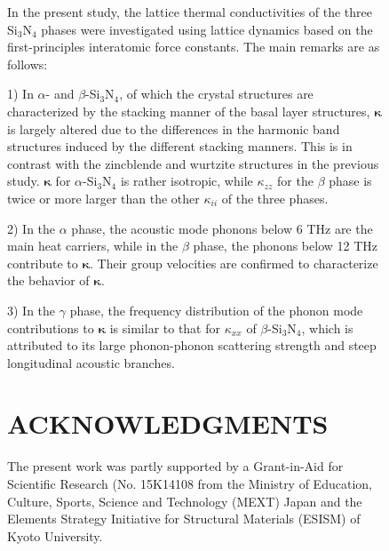 \documentclass[twocolumn,amsmath,amssymb,a4paper,prb,superscriptaddress,floatfix]{revtex4-1}
\begin{document}
\begin{figure}[h]
In the present study, the lattice thermal conductivities of the
three Si$_3$N$_4$ phases were investigated using lattice dynamics based on the
first-principles interatomic force constants. The main remarks are as follows:

1) In $\alpha$- and $\beta$-Si$_3$N$_4$, of which the crystal structures are
characterized by the stacking manner of the basal layer structures,
$\boldsymbol{\kappa}$ is largely altered due to the differences in the harmonic
band structures induced by the different stacking manners. This is in contrast
with the zincblende and wurtzite structures in the previous
study\cite{phono3py}. $\boldsymbol{\kappa}$ for $\alpha$-Si$_3$N$_4$ is rather
isotropic, while $\kappa$$_{zz}$ for the $\beta$ phase is twice or more larger
than the other $\kappa_{ii}$ of the three phases.

2) In the $\alpha$ phase, the acoustic mode phonons below 6 THz are the main
heat carriers, while in the $\beta$ phase, the phonons below 12 THz contribute
to $\boldsymbol{\kappa}$. Their group velocities are confirmed to characterize
the behavior of $\boldsymbol{\kappa}$.

3) In the $\gamma$ phase, the frequency distribution of the phonon mode
contributions to $\boldsymbol{\kappa}$ is similar to that for $\kappa_{xx}$ of
$\beta$-Si$_3$N$_4$, which is attributed to its large phonon-phonon scattering
strength and steep longitudinal acoustic branches.



\section*{ACKNOWLEDGMENTS}
The present work was partly supported by a Grant-in-Aid for Scientific
Research (No. 15K14108 from the Ministry of Education, Culture, Sports, Science
and Technology (MEXT) Japan and the Elements Strategy Initiative for Structural
Materials (ESISM) of Kyoto University.

\appendix

\end{figure}
\end{document}
